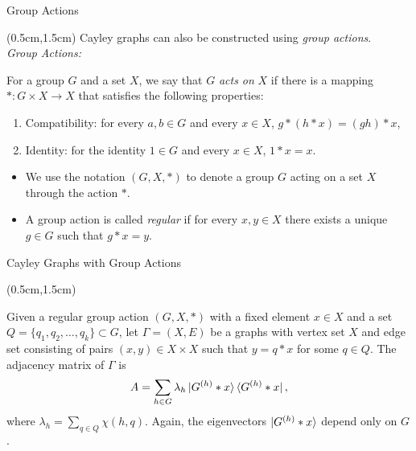 \documentclass{beamer}
\theoremstyle{definition}
\begin{document}
\begin{frame}{Group Actions}
    
    \begin{textblock*}{12cm}(0.5cm,1.5cm)
        Cayley graphs can also be constructed using \textit{group actions}.\\
        \vspace{0.5cm}
        \textit{Group Actions:}
        \vspace{0.5cm}
                
        For a group $G$ and a set $X$, we say that $G$ \textit{acts on} $X$ if there is a mapping $*: G \times X \to X$ that satisfies the following properties:
        \begin{enumerate}
            \item Compatibility: for every $a, b \in G$ and every $x \in X$, $g * (h * x) = (gh) * x$,
            \item Identity: for the identity $1 \in G$ and every $x \in X$, $1 * x = x$. 
        \end{enumerate}

        \vspace{0.5 cm}
        \begin{itemize}
            \item  We use the notation $(G, X, *)$ to denote a group $G$ acting on a set $X$ through the action $*$.
            \item  A group action is called \textit{regular} if for every $x, y \in X$ there exists a unique $g \in G$ such that $g * x = y$.
        \end{itemize}


    \end{textblock*}

\end{frame}




\begin{frame}{Cayley Graphs with Group Actions}
    \begin{textblock*}{12cm}(0.5cm,1.5cm)

    
     Given a regular group action $(G, X, *)$ with a fixed element $x \in X$ and a set  $Q = \{q_1, q_2, \dots, q_k\} \subset G$, let $\Gamma = (X, E)$ be a graphs with vertex set $X$ and edge set consisting of pairs $(x, y) \in X \times X$ such that $y = q * x$ for some $q \in Q$. The adjacency matrix of $\Gamma$ is
    \[ A = \sum_{h \in G} \lambda_h \ket{G^{(h)} * x} \bra{G^{(h)} * x}, \]
    where $\lambda_h = \sum_{q \in Q} \chi(h, q)$. Again, the eigenvectors $\ket{G^{(h)} * x}$ depend only on $G$.
        
    \end{textblock*}
\end{frame}
\end{document}
